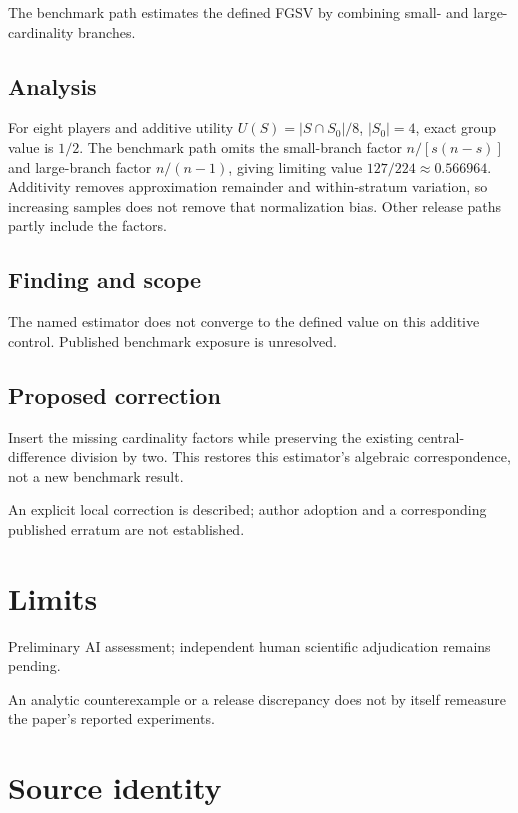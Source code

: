 \documentclass[11pt]{article}
\begin{document}
The benchmark path estimates the defined FGSV by combining small- and large-cardinality branches.

\subsection*{Analysis}

For eight players and additive utility \(U(S)=|S\cap S_0|/8\), \(|S_0|=4\), exact group value is \(1/2\). The benchmark path omits the small-branch factor \(n/[s(n-s)]\) and large-branch factor \(n/(n-1)\), giving limiting value \(127/224\approx0.566964\). Additivity removes approximation remainder and within-stratum variation, so increasing samples does not remove that normalization bias. Other release paths partly include the factors.

\subsection*{Finding and scope}

The named estimator does not converge to the defined value on this additive control. Published benchmark exposure is unresolved.

\subsection*{Proposed correction}

Insert the missing cardinality factors while preserving the existing central-difference division by two. This restores this estimator’s algebraic correspondence, not a new benchmark result.

An explicit local correction is described; author adoption and a corresponding published erratum are not established.

\section*{Limits}

Preliminary AI assessment; independent human scientific adjudication remains pending.\par

An analytic counterexample or a release discrepancy does not by itself remeasure the paper’s reported experiments.\par

\section*{Source identity}
\end{document}
